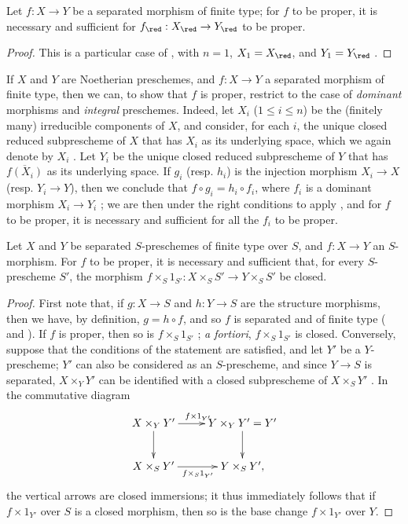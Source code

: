 \begin{corollary}[5.4.6]
\label{II.5.4.6}
Let $f:X\to Y$ be a separated morphism of finite type; for $f$ to be proper, it is necessary and sufficient for $f_\red:X_\red\to Y_\red$ to be proper.
\end{corollary}

\begin{proof}
This is a particular case of , with $n=1$, $X_1=X_\red$, and $Y_1=Y_\red$ .
\end{proof}

\begin{env}[5.4.7]
\label{II.5.4.7}
If $X$ and $Y$ are Noetherian preschemes, and $f:X\to Y$ a separated morphism of finite type, then we can, to show that $f$ is proper, restrict to the case of \emph{dominant} morphisms and \emph{integral} preschemes.
Indeed, let $X_i$ ($1\leq i\leq n$) be the (finitely many) irreducible components of $X$, and consider, for each $i$, the unique closed reduced subprescheme of $X$ that has $X_i$ as its underlying space, which we again denote by $X_i$ .
Let $Y_i$ be the unique closed reduced subprescheme of $Y$ that has $\overline{f(X_i)}$ as its underlying space.
If $g_i$ (resp. $h_i$) is the injection morphism $X_i\to X$ (resp. $Y_i\to Y$), then we conclude that $f\circ g_i=h_i\circ f_i$, where $f_i$ is a dominant morphism $X_i\to Y_i$ ;
we are then under the right conditions to apply , and for $f$ to be proper, it is necessary and sufficient for all the $f_i$ to be proper.
\end{env}

\begin{corollary}[5.4.8]
\label{II.5.4.8}
Let $X$ and $Y$ be separated $S$-preschemes of finite type over $S$, and $f:X\to Y$ an $S$-morphism.
For $f$ to be proper, it is necessary and sufficient that, for every $S$-prescheme $S'$, the morphism $f\times_S 1_{S'}:X\times_S S'\to Y\times_S S'$ be closed.
\end{corollary}

\begin{proof}
First note that, if $g:X\to S$ and $h:Y\to S$ are the structure morphisms, then we have, by definition, $g=h\circ f$, and so $f$ is separated and of finite type ( and ).
If $f$ is proper, then so is $f\times_S 1_{S'}$ ; \emph{a fortiori}, $f\times_S 1_{S'}$ is closed.
Conversely, suppose that the conditions of the statement are satisfied, and let $Y'$ be a $Y$-prescheme;
$Y'$ can also be considered as an $S$-prescheme, and since $Y\to S$ is separated, $X\times_Y Y'$ can be identified with a closed subprescheme of $X\times_S Y'$ .
In the commutative diagram
\[
  \xymatrix{
    X\times_Y Y'\ar[r]^{f\times1_{Y'}}\ar[d] &
    Y\times_Y Y'=Y'\ar[d]\\
    X\times_S Y'\ar[r]_{f\times_S1_{Y'}} &
    Y\times_S Y',
  }
\]
the vertical arrows are closed immersions; it thus immediately follows that if $f\times1_{Y'}$ over $S$ is a closed morphism, then so is the base change $f\times1_{Y'}$ over $Y$.
\end{proof}


